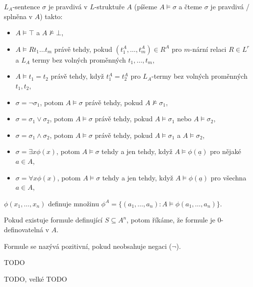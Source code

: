 \documentclass[12pt]{article}                   %
\begin{document}
        \begin{definice}
            $L_A$-sentence $\sigma$ je pravdivá v $L$-struktuře $A$ (píšeme $A \models \sigma$ a čteme $\sigma$ je pravdivá / splněna v $A$) takto:
            
            \begin{itemize}
                \item $A \models \top$ a $A \not\models \bot$,
                \item $A \models Rt_1…t_m$ právě tehdy, pokud $(t^A_1, …, t^A_m) \in R^A$ pro $m$-nární relaci $R \in L^r$ a $L_A$ termy bez volných proměnných $t_1, …, t_m$,
                \item $A \models t_1 = t_2$ právě tehdy, když $t_1^A = t_2^A$ pro $L_A$-termy bez volných proměnných $t_1, t_2$,
                \item $\sigma = \neg \sigma_1$, potom $A \models \sigma$ právě tehdy, pokud $A \not\models \sigma_1$,
                \item $\sigma = \sigma_1 \lor \sigma_2$, potom $A \models \sigma$ právě tehdy, pokud $A \models \sigma_1$ nebo $A \models \sigma_2$,
                \item $\sigma = \sigma_1 \land \sigma_2$, potom $A \models \sigma$ právě tehdy, pokud $A \models \sigma_1$ a $A \models \sigma_2$,
                \item $\sigma = \exists x \phi(x)$, potom $A \models \sigma$ tehdy a jen tehdy, když $A \models \phi(\underline{a})$ pro nějaké $a \in A$,
                \item $\sigma = \forall x \phi(x)$, potom $A \models \sigma$ tehdy a jen tehdy, když $A \models \phi(\underline{a})$ pro všechna $a \in A$,
            \end{itemize}
        \end{definice}

        \begin{definice}
            $\phi(x_1, …, x_n)$ definuje množinu $\phi^A = \{(a_1, …, a_n) : A \models \phi(a_1, …, a_n)\}$.

            Pokud existuje formule definující $S \subseteq A^n$, potom říkáme, že formule je 0-definovatelná v $A$.
        \end{definice}

        \begin{definice}
            Formule se nazývá pozitivní, pokud neobsahuje negaci ($\neg$).
        \end{definice}

        TODO


        TODO, velké TODO
\end{document}
